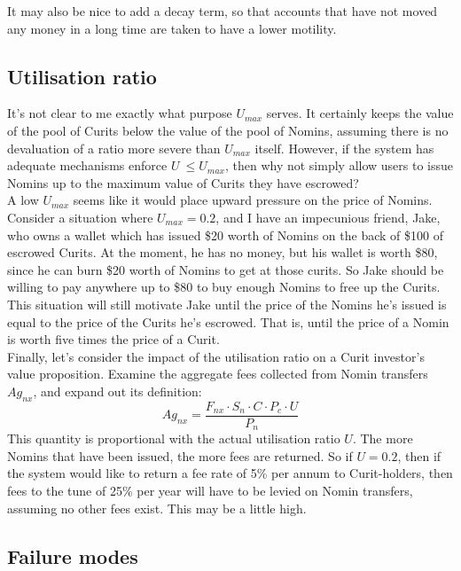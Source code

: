 \documentclass{article}
\begin{document}
\noindent It may also be nice to add a decay term, so that accounts that have not moved any money in a long time are taken to have a lower motility.


\pagebreak
\subsection{Utilisation ratio}

It's not clear to me exactly what purpose \(U_{max}\) serves. It certainly keeps the value of the pool of Curits below the value of the pool of Nomins, assuming there is no devaluation of a ratio more severe than \(U_{max}\) itself. However, if the system has adequate mechanisms enforce \(U\ \leq U_{max}\), then why not simply allow users to issue Nomins up to the maximum value of Curits they have escrowed? \\

\noindent A low \(U_{max}\) seems like it would place upward pressure on the price of Nomins. Consider a situation where \(U_{max} = 0.2\), and I have an impecunious friend, Jake, who owns a wallet which has issued \$20 worth of Nomins on the back of \$100 of escrowed Curits. At the moment, he has no
money, but his wallet is worth \$80, since he can burn \$20 worth of Nomins to get at those curits. So Jake should be willing to pay anywhere up to \$80 to buy enough Nomins to free up the Curits. This situation will still motivate Jake until the price of the Nomins he's issued is equal to the price of the Curits he's escrowed. That is, until the price of a Nomin is worth five times the price of a Curit.\\

\noindent Finally, let's consider the impact of the utilisation ratio on a Curit investor's value proposition. Examine the aggregate fees collected from Nomin transfers \(Ag_{nx}\), and expand out its definition:
\[Ag_{nx} = \frac{F_{nx} \cdot S_n \cdot C \cdot P_c \cdot U}{P_n}\]
This quantity is proportional with the actual utilisation ratio \(U\). The more Nomins that have been issued, the more fees are returned. So if \(U = 0.2\), then if the system would like to return a fee rate of 5\% per annum to Curit-holders, then fees to the tune of 25\% per year will have to be levied on Nomin transfers, assuming no other fees exist. This may be a little high.

\pagebreak
\subsection{Failure modes}
\end{document}
